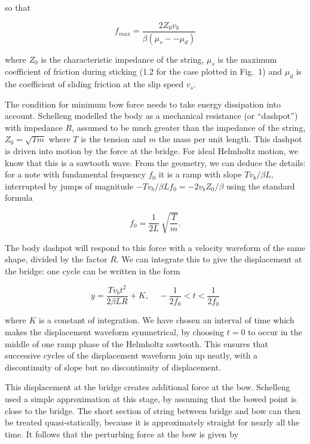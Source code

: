   \noindent{}so that 

  \begin{equation*}f_{max}=\dfrac{2Z_0 v_b}{\beta (\mu_s -- \mu_d)} 
  \tag{4}\end{equation*} 

  \noindent{}where $Z_0$ is the characteristic impedance of the string, $\mu_s$ 
  is the maximum coefficient of friction during sticking (1.2 for the case 
  plotted in Fig.\ 1) and $\mu_d$ is the coefficient of sliding friction at the 
  slip speed $v_s$. 

  The condition for minimum bow force needs to take energy dissipation into 
  account. Schelleng modelled the body as a mechanical resistance (or 
  ``dashpot'') with impedance $R$, assumed to be much greater than the 
  impedance of the string, $Z_0 = \sqrt{Tm}$ where $T$ is the tension and $m$ 
  the mass per unit length. This dashpot is driven into motion by the force at 
  the bridge. For ideal Helmholtz motion, we know that this is a sawtooth wave. 
  From the geometry, we can deduce the details: for a note with fundamental 
  frequency $f_0$ it is a ramp with slope $Tv_b/\beta L$, interrupted by jumps 
  of magnitude $-Tv_b/\beta L f_0=-2v_b Z_0/\beta$ using the standard formula 

  \begin{equation*}f_0=\dfrac{1}{2L}~\sqrt{\dfrac{T}{m}} . 
  \tag{5}\end{equation*} 

  The body dashpot will respond to this force with a velocity waveform of the 
  same shape, divided by the factor $R$. We can integrate this to give the 
  displacement at the bridge: one cycle can be written in the form 

  \begin{equation*}y=\dfrac{T v_b t^2}{2 \beta L R} + K, 
  \mathrm{~~~~~}-\dfrac{1}{2f_0} < t < \dfrac{1}{2f_0} \tag{6}\end{equation*} 

  \noindent{}where $K$ is a constant of integration. We have chosen an interval 
  of time which makes the displacement waveform symmetrical, by choosing $t=0$ 
  to occur in the middle of one ramp phase of the Helmholtz sawtooth. This 
  ensures that successive cycles of the displacement waveform join up neatly, 
  with a discontinuity of slope but no discontinuity of displacement. 

  This displacement at the bridge creates additional force at the bow. 
  Schelleng used a simple approximation at this stage, by assuming that the 
  bowed point is close to the bridge. The short section of string between 
  bridge and bow can then be treated quasi-statically, because it is 
  approximately straight for nearly all the time. It follows that the 
  perturbing force at the bow is given by 

